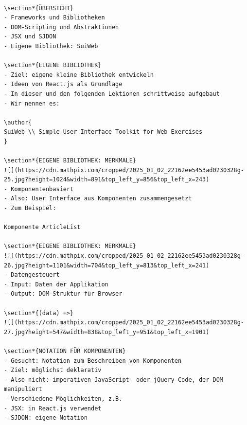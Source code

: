 \begin{verbatim}

\section*{ÜBERSICHT}
- Frameworks und Bibliotheken
- DOM-Scripting und Abstraktionen
- JSX und SJDON
- Eigene Bibliothek: SuiWeb

\section*{EIGENE BIBLIOTHEK}
- Ziel: eigene kleine Bibliothek entwickeln
- Ideen von React.js als Grundlage
- In dieser und den folgenden Lektionen schrittweise aufgebaut
- Wir nennen es:

\author{
SuiWeb \\ Simple User Interface Toolkit for Web Exercises
}

\section*{EIGENE BIBLIOTHEK: MERKMALE}
![](https://cdn.mathpix.com/cropped/2025_01_02_22162ee5453ad0230328g-25.jpg?height=1024&width=891&top_left_y=856&top_left_x=243)
- Komponentenbasiert
- Also: User Interface aus Komponenten zusammengesetzt
- Zum Beispiel:

Komponente ArticleList

\section*{EIGENE BIBLIOTHEK: MERKMALE}
![](https://cdn.mathpix.com/cropped/2025_01_02_22162ee5453ad0230328g-26.jpg?height=1101&width=704&top_left_y=813&top_left_x=241)
- Datengesteuert
- Input: Daten der Applikation
- Output: DOM-Struktur für Browser

\section*{(data) =>}
![](https://cdn.mathpix.com/cropped/2025_01_02_22162ee5453ad0230328g-27.jpg?height=547&width=838&top_left_y=951&top_left_x=1901)

\section*{NOTATION FÜR KOMPONENTEN}
- Gesucht: Notation zum Beschreiben von Komponenten
- Ziel: möglichst deklarativ
- Also nicht: imperativen JavaScript- oder jQuery-Code, der DOM manipuliert
- Verschiedene Möglichkeiten, z.B.
- JSX: in React.js verwendet
- SJDON: eigene Notation
\end{verbatim}

